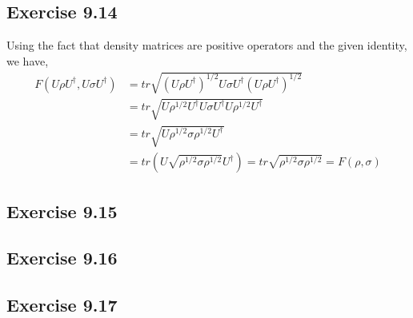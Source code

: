 \documentclass[a4paper,12pt]{article}
\begin{document}
\subsection*{Exercise 9.14}
Using the fact that density matrices are positive operators and the given identity, we have,
\begin{align*}
    F(U\rho U^\dagger, U\sigma U^\dagger)&=
    tr\sqrt{(U\rho U^\dagger)^{1/2}U\sigma U^\dagger(U\rho U^\dagger)^{1/2}}\\&=
    tr\sqrt{U\rho^{1/2} U^\dagger U\sigma U^\dagger U\rho^{1/2} U^\dagger}\\&=
    tr\sqrt{U\rho^{1/2} \sigma \rho^{1/2} U^\dagger}\\&=
    tr(U\sqrt{\rho^{1/2} \sigma \rho^{1/2}}U^\dagger)=tr\sqrt{\rho^{1/2} \sigma \rho^{1/2}}=
    F(\rho, \sigma)
\end{align*}
\subsection*{Exercise 9.15}
\subsection*{Exercise 9.16}
\subsection*{Exercise 9.17}
\end{document}
